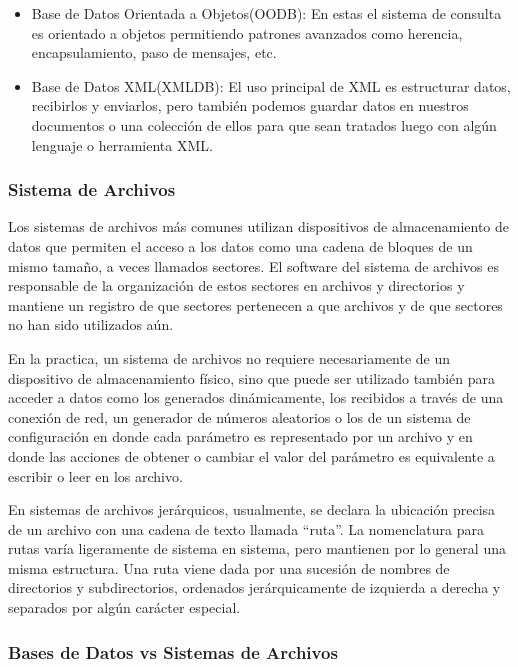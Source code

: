 \begin{itemize}

	\item Base de Datos Orientada a Objetos(OODB): En estas el sistema de consulta es orientado a objetos permitiendo patrones avanzados como herencia, encapsulamiento, paso de mensajes, etc.
	
	\item Base de Datos XML(XMLDB): El uso principal de XML es estructurar datos, recibirlos y enviarlos, pero también podemos guardar datos en nuestros documentos o una colección de ellos para que sean tratados luego con algún lenguaje o herramienta XML.

\end{itemize}


\subsubsection*{Sistema de Archivos}

Los sistemas de archivos más comunes utilizan dispositivos de almacenamiento de datos que permiten el acceso a los datos como una cadena de bloques de un mismo tamaño, a veces llamados sectores. El software del sistema de archivos es responsable de la organización de estos sectores en archivos y directorios y mantiene un registro de que sectores pertenecen a que archivos y de que sectores no han sido utilizados aún.

En la practica, un sistema de archivos no requiere necesariamente de un dispositivo de almacenamiento físico, sino que puede ser utilizado también para acceder a datos como los generados dinámicamente, los recibidos a través de una conexión de red, un generador de números aleatorios o los de un sistema de configuración en donde cada parámetro es representado por un archivo y en donde las acciones de obtener o cambiar el valor del parámetro es equivalente a escribir o leer en los archivo.

En sistemas de archivos jerárquicos, usualmente, se declara la ubicación precisa de un archivo con una cadena de texto llamada ``ruta''. La nomenclatura para rutas varía ligeramente de sistema en sistema, pero mantienen por lo general una misma estructura. Una ruta viene dada por una sucesión de nombres de directorios y subdirectorios, ordenados jerárquicamente de izquierda a derecha y separados por algún carácter especial.


\subsubsection*{Bases de Datos vs Sistemas de Archivos}

